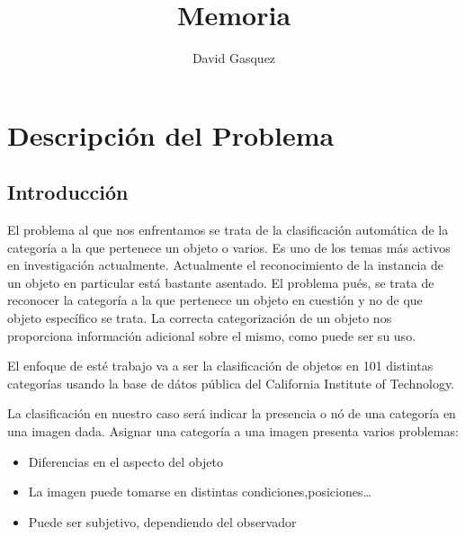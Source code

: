 \documentclass[a4paper,12pt]{article}
\title{
\huge \bfseries Memoria
}
\author{David Gasquez}
\date{}
\begin{document}



\pagestyle{empty}
\renewcommand{\contentsname}{\centering Índice}
\tableofcontents
\newpage



\pagestyle{fancy}
\cfoot{\thepage}
\rhead{}
\renewcommand{\headrulewidth}{0pt}
\renewcommand{\footrulewidth}{0.4pt}
\renewcommand{\headheight}{15pt}



\section{Descripción del Problema}

\subsection{Introducción}

El problema al que nos enfrentamos se trata de la clasificación automática de
la categoría a la que pertenece un objeto o varios. Es uno de los temas más 
activos en investigación actualmente. Actualmente el reconocimiento de la
instancia de un objeto en particular está bastante asentado. El problema
pués, se trata de reconocer la categoría a la que pertenece un objeto en
cuestión y no de que objeto específico se trata. La correcta categorización 
de un objeto nos proporciona información adicional sobre el mismo, como puede
ser su uso.

El enfoque de esté trabajo va a ser la clasificación de objetos en 101 
distintas categorías usando la base de dátos pública del
California Institute of Technology.

La clasificación en nuestro caso será indicar la presencia o nó de una categoría
en una imagen dada. Asignar una categoría a una imagen presenta varios 
problemas:
\begin{itemize}
  \item Diferencias en el aspecto del objeto
  \item La imagen puede tomarse en distintas condiciones,posiciones\ldots
  \item Puede ser subjetivo, dependiendo del observador
\end{itemize}
\end{document}

